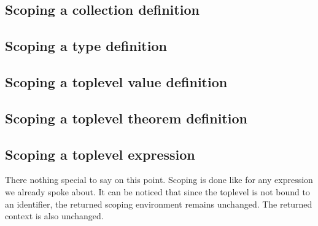 \subsection{Scoping a collection definition}

\subsection{Scoping a type definition}

\subsection{Scoping a toplevel value definition}

\subsection{Scoping a toplevel theorem definition}

\subsection{Scoping a toplevel expression}
There nothing special to say on this point. Scoping is done like for
any expression we already spoke about. It can be noticed that since
the toplevel is not bound to an identifier, the returned scoping
environment remains unchanged. The returned context is also
unchanged.